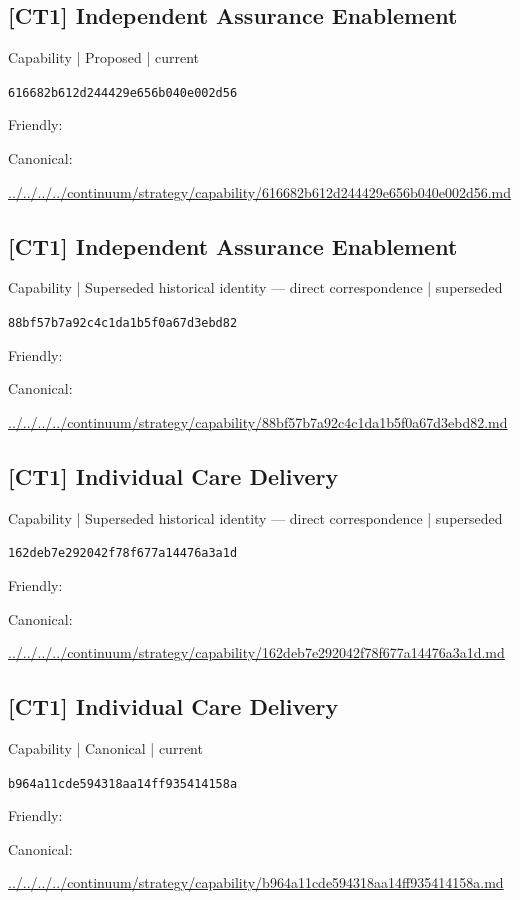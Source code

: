\documentclass[10pt,a4paper]{article}
\begin{document}
\subsection*{[CT1] Independent Assurance Enablement}
{\small Capability | Proposed | current}\par
\texttt{616682b612d244429e656b040e002d56}\par
Friendly: \par
Canonical: \par
{\footnotesize\url{../../../../continuum/strategy/capability/616682b612d244429e656b040e002d56.md}}\par
\subsection*{[CT1] Independent Assurance Enablement}
{\small Capability | Superseded historical identity — direct correspondence | superseded}\par
\texttt{88bf57b7a92c4c1da1b5f0a67d3ebd82}\par
Friendly: \par
Canonical: \par
{\footnotesize\url{../../../../continuum/strategy/capability/88bf57b7a92c4c1da1b5f0a67d3ebd82.md}}\par
\subsection*{[CT1] Individual Care Delivery}
{\small Capability | Superseded historical identity — direct correspondence | superseded}\par
\texttt{162deb7e292042f78f677a14476a3a1d}\par
Friendly: \par
Canonical: \par
{\footnotesize\url{../../../../continuum/strategy/capability/162deb7e292042f78f677a14476a3a1d.md}}\par
\subsection*{[CT1] Individual Care Delivery}
{\small Capability | Canonical | current}\par
\texttt{b964a11cde594318aa14ff935414158a}\par
Friendly: \par
Canonical: \par
{\footnotesize\url{../../../../continuum/strategy/capability/b964a11cde594318aa14ff935414158a.md}}\par
\end{document}
